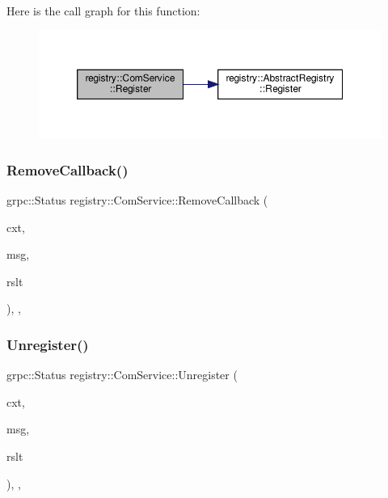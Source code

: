 Here is the call graph for this function\+:\nopagebreak
\begin{figure}[H]
\begin{center}
\leavevmode
\includegraphics[width=350pt]{classregistry_1_1ComService_aae8b56b86316397140c4f1cc4824410a_cgraph}
\end{center}
\end{figure}
\mbox{\label{classregistry_1_1ComService_a702848d7aad6839ba216862478c00d25}} 
\subsubsection{\texorpdfstring{Remove\+Callback()}{RemoveCallback()}}
{\footnotesize\ttfamily grpc\+::\+Status registry\+::\+Com\+Service\+::\+Remove\+Callback (\begin{DoxyParamCaption}\item[{grpc\+::\+Server\+Context $\ast$}]{cxt,  }\item[{Com\+Msg const $\ast$}]{msg,  }\item[{Result $\ast$}]{rslt }\end{DoxyParamCaption})\hspace{0.3cm}{\ttfamily [inline]}, {\ttfamily [override]}, {\ttfamily [private]}}

\mbox{\label{classregistry_1_1ComService_a6a64c38b8adf4443f387af7ed786245c}} 
\subsubsection{\texorpdfstring{Unregister()}{Unregister()}}
{\footnotesize\ttfamily grpc\+::\+Status registry\+::\+Com\+Service\+::\+Unregister (\begin{DoxyParamCaption}\item[{grpc\+::\+Server\+Context $\ast$}]{cxt,  }\item[{Com\+Msg const $\ast$}]{msg,  }\item[{Result $\ast$}]{rslt }\end{DoxyParamCaption})\hspace{0.3cm}{\ttfamily [inline]}, {\ttfamily [override]}, {\ttfamily [private]}}

